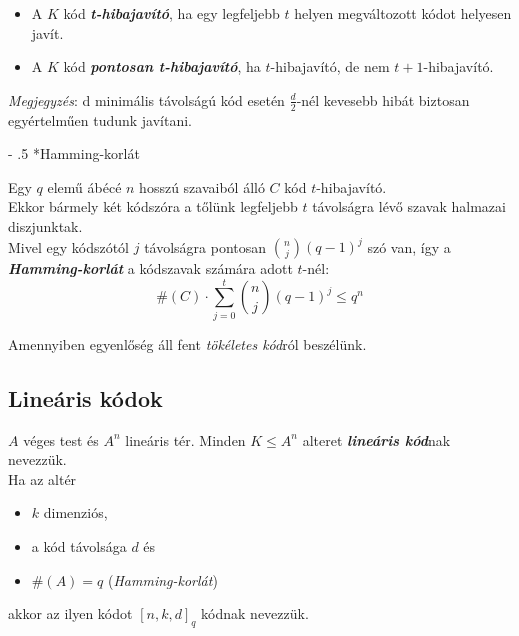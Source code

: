 \documentclass[12pt,margin=0px]{article}
\makeatletter
\newcommand\ddfrac[2]{\frac{\displaystyle #1}{\displaystyle #2}}
\renewcommand\paragraph{%
	\@startsection{paragraph}{4}{0mm}%
	{-\baselineskip}%
	{.5\baselineskip}%
	{\normalfont\normalsize\bfseries}}
\makeatother
\begin{document}
    \begin{itemize}[leftmargin=5.5mm]
        \renewcommand{\labelitemi}{$\vcenter{\hbox{\tiny$\bullet$}}$}
        \item A $K$ kód \emph{\textbf{t-hibajavító}}, ha egy legfeljebb $t$ helyen megváltozott kódot helyesen javít.
        \item A $K$ kód \emph{\textbf{pontosan t-hibajavító}}, ha $t$-hibajavító, de nem $t+1$-hibajavító.
    \end{itemize}

    \noindent \textit{Megjegyzés}: d minimális távolságú kód esetén $\ddfrac{d}{2}$-nél kevesebb hibát biztosan egyértelműen tudunk javítani.

    \paragraph*{Hamming-korlát\\}

    Egy $q$ elemű ábécé $n$ hosszú szavaiból álló $C$ kód $t$-hibajavító. \\
    Ekkor bármely két kódszóra a tőlünk legfeljebb $t$ távolságra lévő szavak halmazai diszjunktak.\\

    \noindent Mivel egy kódszótól $j$ távolságra pontosan $\binom{n}{j}(q-1)^j$ szó van, így a \emph{\textbf{Hamming-korlát}} a kódszavak számára adott $t$-nél:
    \[\#(C) \cdot \sum\limits_{j=0}^{t}\binom{n}{j}(q-1)^j \leq q^n \]

    \noindent Amennyiben egyenlőség áll fent \emph{tökéletes kód}ról beszélünk.

    \subsection*{Lineáris kódok}
			
    $A$ véges test és $A^n$ lineáris tér. Minden $ K \leq A^n$ alteret \emph{\textbf{lineáris kód}}nak nevezzük. \\
    Ha az altér
    \begin{itemize}[leftmargin=5.5mm]
        \renewcommand{\labelitemi}{$\vcenter{\hbox{\tiny$\bullet$}}$}
        \item $k$ dimenziós,
        \item a kód távolsága $d$ és
        \item $\#(A) = q$ (\emph{Hamming-korlát})
    \end{itemize}
    akkor az ilyen kódot $[n,k,d]_q$ kódnak nevezzük.\\
\end{document}
